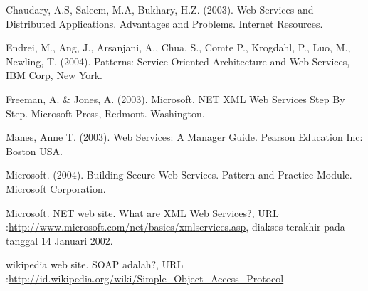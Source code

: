 \documentclass{jtetiproposalskripsi}
\begin{document}

\begin{thebibliography}{9}

Chaudary, A.S, Saleem, M.A, Bukhary, H.Z. (2003). Web Services and Distributed Applications. Advantages and Problems. Internet Resources. 

Endrei, M., Ang, J., Arsanjani, A., Chua, S., Comte P., Krogdahl, P., Luo, M., Newling, T. (2004). Patterns: Service-Oriented Architecture and Web Services, IBM Corp, New York.

Freeman, A. \& Jones, A. (2003). Microsoft. NET XML Web Services Step By Step. Microsoft Press, Redmont. Washington. 

Manes, Anne T. (2003). Web Services: A Manager Guide. Pearson Education Inc: Boston USA.

Microsoft. (2004). Building Secure Web Services. Pattern and Practice Module. Microsoft Corporation.

Microsoft. NET web site. What are XML Web Services?, URL :\url{http://www.microsoft.com/net/basics/xmlservices.asp}, diakses terakhir pada tanggal 14 Januari 2002.

wikipedia web site. SOAP adalah?, URL :\url{http://id.wikipedia.org/wiki/Simple_Object_Access_Protocol}

\end{thebibliography}
\end{document}
